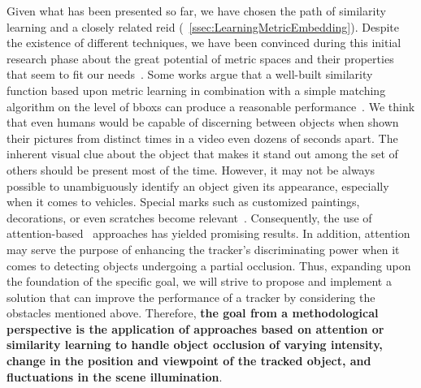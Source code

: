 Given what has been presented so far, we have chosen the path of similarity learning and a closely related \gls{reid} (\sectiontext{}~\ref{ssec:LearningMetricEmbedding}). Despite the existence of different techniques, we have been convinced during this initial research phase about the great potential of metric spaces and their properties that seem to fit our needs~\cite{liu2016ssd}. Some works argue that a well-built similarity function based upon metric learning in combination with a simple matching algorithm on the level of \glspl{bbox} can produce a reasonable performance~\cite{tao2016sint}. We think that even humans would be capable of discerning between objects when shown their pictures from distinct times in a video even dozens of seconds apart. The inherent visual clue about the object that makes it stand out among the set of others should be present most of the time. However, it may not be always possible to unambiguously identify an object given its appearance, especially when it comes to vehicles. Special marks such as customized paintings, decorations, or even scratches become relevant~\cite{liu2016ssd}. Consequently, the use of attention-based~\cite{vaswani2017attention} approaches has yielded promising results. In addition, attention may serve the purpose of enhancing the tracker's discriminating power when it comes to detecting objects undergoing a partial occlusion. Thus, expanding upon the foundation of the specific goal, we will strive to propose and implement a solution that can improve the performance of a tracker by considering the obstacles mentioned above. Therefore, \textbf{the goal from a methodological perspective is the application of approaches based on attention or similarity learning to handle object occlusion of varying intensity, change in the position and viewpoint of the tracked object, and fluctuations in the scene illumination}.
